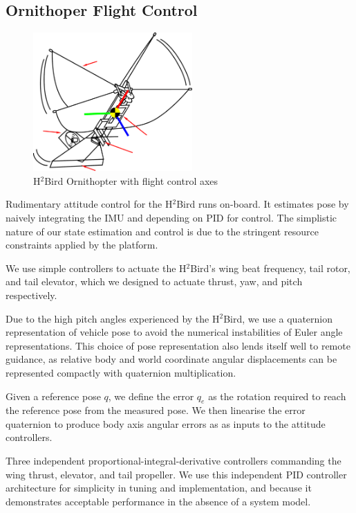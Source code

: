 \documentclass{aamas2013}
\begin{document}
\subsection{Ornithoper Flight Control}

\begin{figure}[tb]
\centering
\includegraphics[height=150pt]{figures/h2bird_axes.pdf}
\caption{H$^2$Bird Ornithopter with flight control axes}
\label{fig:h2Bird_axes}
\end{figure}

Rudimentary attitude control for the H$^2$Bird runs on-board. It estimates 
pose by naively integrating the IMU and depending on PID for control. The 
simplistic nature of our state estimation and control is due to the 
stringent resource constraints applied by the platform.

We use simple controllers to actuate the H$^2$Bird's wing beat frequency, 
tail rotor, and tail elevator, which we designed to actuate thrust, yaw, 
and pitch respectively.

Due to the high pitch angles experienced by the H$^2$Bird, we use a 
quaternion representation of vehicle pose to avoid the numerical 
instabilities of Euler angle representations. This choice of pose 
representation also lends itself well to remote guidance, as relative body 
and world coordinate angular displacements can be represented compactly 
with quaternion multiplication.~\cite{bowman:reasoning} 

Given a reference pose $q$, we define the error $q_e$ as the rotation 
required to reach the reference pose from the measured pose. We then 
linearise the error quaternion to produce body axis angular errors as as 
inputs to the attitude controllers. 

Three independent proportional-integral-derivative controllers commanding 
the wing thrust, elevator, and tail propeller. We use this independent PID 
controller architecture for simplicity in tuning and implementation, and 
because it demonstrates acceptable performance in the absence of a system 
model.
\end{document}
